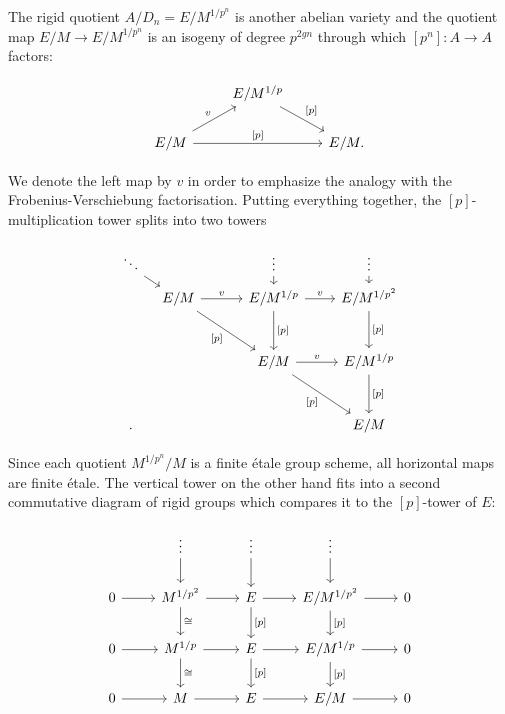 \documentclass[11pt,oneside]{amsart}
\theoremstyle{definition}
\theoremstyle{remark}
\begin{document}
		The rigid quotient $A/D_n = E/M^{1/p^n}$ is another abelian variety and the quotient map $E/M\rightarrow E/M^{1/p^n}$ is an isogeny of degree $p^{2gn}$  through which  $[p^n]:A\rightarrow A$ factors: 
		\begin{center}
			\begin{equation}\label{factorisation of [p] over E/M}
			\begin{tikzcd}
				& E/M^{1/p} \arrow[rd, "{[p]}"] &  \\
				E/M \arrow[rr, "{[p]}"] \arrow[ru,"v"] &  & E/M.
			\end{tikzcd}
			\end{equation}
		\end{center}
		We denote the left map by $v$ in order to emphasize the analogy with the Frobenius-Verschiebung factorisation.
		Putting everything together, the $[p]$-multiplication tower splits into two towers
		\begin{center}
		\begin{equation}\label{p-multiplication tower of E/M splits into vertical and horizontal tower}
		\begin{tikzcd}[column sep={1.2cm,between origins},row sep={0.8cm,between origins}]
			\ddots \arrow[rd] &  &  & \vdots \arrow[d] &  & \vdots \arrow[d] \\
			& E/M \arrow[rr,"v"] \arrow[rrdd, "{[p]}"'] &  & E/M^{1/p} \arrow[rr,"v"] \arrow[dd,"{[p]}"] &  & E/M^{1/p^2} \arrow[dd,"{[p]}"] \\
			&  &  &  &  &  \\
			&  &  & E/M \arrow[rrdd, "{[p]}"'] \arrow[rr,"v"] &  & E/M^{1/p} \arrow[dd,"{[p]}"] \\
			&  &  &  &  &  \\.
			&  &  &  &  & E/M
		\end{tikzcd}
		\end{equation}
		\end{center}
		Since each quotient $M^{1/p^n}/M$ is a finite \'etale group scheme, all horizontal maps are finite \'etale. The vertical tower on the other hand fits into a second commutative diagram of rigid groups which compares it to the $[p]$-tower of $E$:
		
		\begin{center}
		\begin{equation}\label{F-tower for E/M}
		\begin{tikzcd}
			& \vdots \arrow[d] & \vdots \arrow[d] & \vdots \arrow[d] &  \\
			0 \arrow[r] & M^{1/p^2} \arrow[d, "\cong"] \arrow[r] & E \arrow[d, "{[p]}"] \arrow[r] & E/M^{1/p^2} \arrow[d, "{[p]}"] \arrow[r] & 0 \\
			0 \arrow[r] & M^{1/p} \arrow[d, "\cong"] \arrow[r] & E \arrow[d, "{[p]}"] \arrow[r] & E/M^{1/p} \arrow[d, "{[p]}"] \arrow[r] & 0 \\
			0 \arrow[r] & M \arrow[r] & E \arrow[r] & E/M \arrow[r] & 0
		\end{tikzcd}
		\end{equation}
		\end{center}
		
\end{document}
